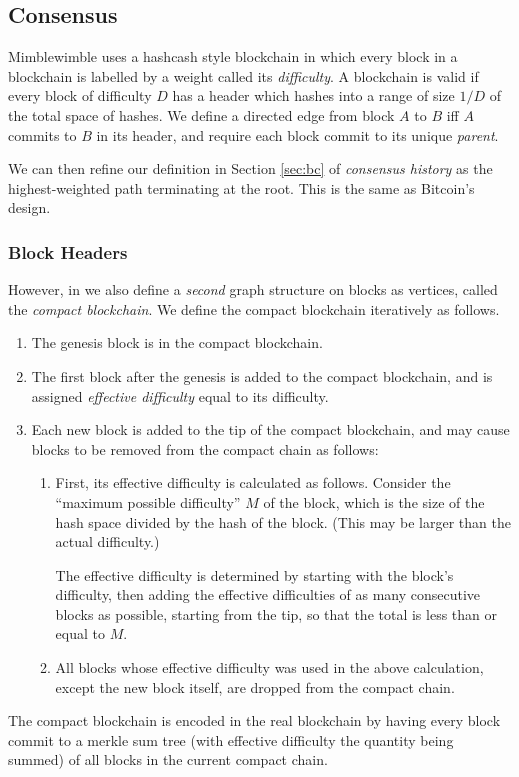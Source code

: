 \documentclass[letterpaper]{article}
\begin{document}
\subsection{Consensus\label{sec:consensus}}

Mimblewimble uses a hashcash\cite{back2002} style blockchain in which every
block in a blockchain is labelled by a weight called its \emph{difficulty}.
A blockchain is valid if every block of difficulty $D$ has a header which
hashes into a range of size $1/D$ of the total space of hashes. We define
a directed edge from block $A$ to $B$ iff $A$ commits to $B$ in its header,
and require each block commit to its unique \emph{parent}.

We can then refine our definition in Section \ref{sec:bc} of \emph{consensus
history} as the highest-weighted path terminating at the root. This is the
same as Bitcoin's design.

\subsubsection{Block Headers\label{sec:bhead}}

However, in we also define a \emph{second} graph structure on blocks as
vertices, called the \emph{compact blockchain}. We define the compact
blockchain iteratively as follows.
\begin{enumerate}
\item The genesis block is in the compact blockchain.
\item The first block after the genesis is added to the compact blockchain,
and is assigned \emph{effective difficulty} equal to its difficulty.
\item Each new block is added to the tip of the compact blockchain, and may
cause blocks to be removed from the compact chain as follows: 
\begin{enumerate}
\item First, its effective difficulty is calculated as follows. Consider
the ``maximum possible difficulty'' $M$ of the block, which is the size
of the hash space divided by the hash of the block. (This may be larger
than the actual difficulty.)

The effective difficulty is determined by starting with the block's
difficulty, then adding the effective difficulties of as many
consecutive blocks as possible, starting from the tip, so that the total
is less than or equal to $M$.

\item All blocks whose effective difficulty was used in the above calculation,
except the new block itself, are dropped from the compact chain.
\end{enumerate}
\end{enumerate}
The compact blockchain is encoded in the real blockchain by having every
block commit to a merkle sum tree (with effective difficulty the quantity
being summed) of all blocks in the current compact chain. 
\end{document}
